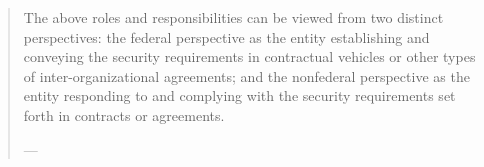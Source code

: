 \begin{formal}
\begin{quote}
The above roles and responsibilities can be viewed from two distinct perspectives: the federal perspective as the entity establishing and conveying the security requirements in contractual vehicles or other types of inter-organizational agreements; and the nonfederal perspective as the entity responding to and complying with the security requirements set forth in contracts or agreements.

\hfill
---\cite{csfNIST800171}
\end{quote}
\end{formal} 